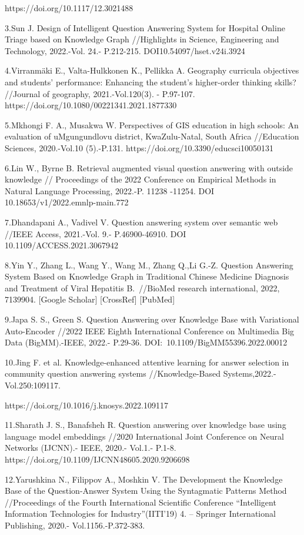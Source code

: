 https://doi.org/10.1117/12.3021488

3.Sun J. Design of Intelligent Question Answering System for Hospital
Online Triage based on Knowledge Graph //Highlights in Science,
Engineering and Technology, 2022.-Vol. 24.- P.212-215.
DOI10.54097/hset.v24i.3924

4.Virranmäki E., Valta-Hulkkonen K., Pellikka A. Geography curricula
objectives and students' performance: Enhancing the student's
higher-order thinking skills? //Journal of geography, 2021.-Vol.120(3).
- P.97-107. https://doi.org/10.1080/00221341.2021.1877330

5.Mkhongi F. A., Musakwa W. Perspectives of GIS education in high
schools: An evaluation of uMgungundlovu district, KwaZulu-Natal, South
Africa //Education Sciences, 2020.-Vol.10 (5).-P.131.
https://doi.org/10.3390/educsci10050131

6.Lin W., Byrne B. Retrieval augmented visual question answering with
outside knowledge // Proceedings of the 2022 Conference on Empirical
Methods in Natural Language Processing, 2022.-P. 11238 -11254. DOI
10.18653/v1/2022.emnlp-main.772

7.Dhandapani A., Vadivel V. Question answering system over semantic web
//IEEE Access, 2021.-Vol. 9.- P.46900-46910. DOI
10.1109/ACCESS.2021.3067942

8.Yin Y., Zhang L., Wang Y., Wang M., Zhang Q.,Li G.-Z. Question
Answering System Based on Knowledge Graph in Traditional Chinese
Medicine Diagnosis and Treatment of Viral Hepatitis B.~//BioMed research
international, 2022, 7139904. {[}Google Scholar{]} {[}CrossRef{]}
{[}PubMed{]}

9.Japa S. S., Green S. Question Answering over Knowledge Base with
Variational Auto-Encoder //2022 IEEE Eighth International Conference on
Multimedia Big Data (BigMM).-IEEE, 2022.- P.29-36.
DOI:~10.1109/BigMM55396.2022.00012

10.Jing F. et al. Knowledge-enhanced attentive learning for answer
selection in community question answering systems //Knowledge-Based
Systems,2022.- Vol.250:109117.

https://doi.org/10.1016/j.knosys.2022.109117

11.Sharath J. S., Banafsheh R. Question answering over knowledge base
using language model embeddings //2020 International Joint Conference on
Neural Networks (IJCNN).- IEEE, 2020.- Vol.1.- P.1-8.
https://doi.org/10.1109/IJCNN48605.2020.9206698

12.Yarushkina N., Filippov A., Moshkin V. The Development the Knowledge
Base of the Question-Answer System Using the Syntagmatic Patterns Method
//Proceedings of the Fourth International Scientific Conference
``Intelligent Information Technologies for Industry''(IITI'19) 4. --
Springer International Publishing, 2020.- Vol.1156.-P.372-383.

